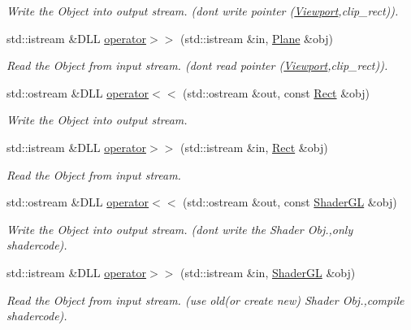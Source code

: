 \begin{DoxyCompactItemize}
\begin{DoxyCompactList}\small\item\em Write the Object into output stream. (dont write pointer (\hyperlink{class_f2_c_1_1_viewport}{Viewport},clip\_\-rect)). \item\end{DoxyCompactList}\item 
std::istream \&DLL \hyperlink{namespace_f2_c_a139e98cb80847efff13230483d8cb882}{operator$>$$>$} (std::istream \&in, \hyperlink{class_f2_c_1_1_plane}{Plane} \&obj)
\begin{DoxyCompactList}\small\item\em Read the Object from input stream. (dont read pointer (\hyperlink{class_f2_c_1_1_viewport}{Viewport},clip\_\-rect)). \item\end{DoxyCompactList}\item 
std::ostream \&DLL \hyperlink{namespace_f2_c_a27f9afc7d11634019d6d787b1cb4e8ac}{operator$<$$<$} (std::ostream \&out, const \hyperlink{class_f2_c_1_1_rect}{Rect} \&obj)
\begin{DoxyCompactList}\small\item\em Write the Object into output stream. \item\end{DoxyCompactList}\item 
std::istream \&DLL \hyperlink{namespace_f2_c_a247b440871b117a3e3375f2687d76197}{operator$>$$>$} (std::istream \&in, \hyperlink{class_f2_c_1_1_rect}{Rect} \&obj)
\begin{DoxyCompactList}\small\item\em Read the Object from input stream. \item\end{DoxyCompactList}\item 
std::ostream \&DLL \hyperlink{namespace_f2_c_aeda54e2dc7edab2a8530bc9cc2ef544d}{operator$<$$<$} (std::ostream \&out, const \hyperlink{class_f2_c_1_1_shader_g_l}{ShaderGL} \&obj)
\begin{DoxyCompactList}\small\item\em Write the Object into output stream. (dont write the Shader Obj.,only shadercode). \item\end{DoxyCompactList}\item 
std::istream \&DLL \hyperlink{namespace_f2_c_ad61f5b4d14aedf2086d01c681182582a}{operator$>$$>$} (std::istream \&in, \hyperlink{class_f2_c_1_1_shader_g_l}{ShaderGL} \&obj)
\begin{DoxyCompactList}\small\item\em Read the Object from input stream. (use old(or create new) Shader Obj.,compile shadercode). \item\end{DoxyCompactList}\item 

\end{DoxyCompactItemize}
